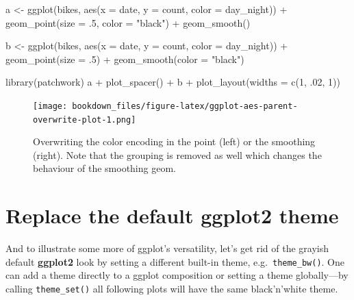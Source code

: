 \documentclass[
]{krantz}
\makeatletter
\newenvironment{Shaded}{\begin{snugshade}}{\end{snugshade}}
\newcommand{\AttributeTok}[1]{\textcolor[rgb]{0.61,0.61,0.61}{#1}}
\newcommand{\DecValTok}[1]{\textcolor[rgb]{0.06,0.06,0.06}{#1}}
\newcommand{\FunctionTok}[1]{\textcolor[rgb]{0,0,0}{#1}}
\newcommand{\NormalTok}[1]{#1}
\newcommand{\OtherTok}[1]{\textcolor[rgb]{0.37,0.37,0.37}{#1}}
\newcommand{\SpecialCharTok}[1]{\textcolor[rgb]{0,0,0}{#1}}
\newcommand{\StringTok}[1]{\textcolor[rgb]{0.5,0.5,0.5}{#1}}
\newenvironment{kframe}{%
\medskip{}
\setlength{\fboxsep}{.8em}
 \def\at@end@of@kframe{}%
 \ifinner\ifhmode%
  \def\at@end@of@kframe{\end{minipage}}%
  \begin{minipage}{\columnwidth}%
 \fi\fi%
 \def\FrameCommand##1{\hskip\@totalleftmargin \hskip-\fboxsep
 \colorbox{shadecolor}{##1}\hskip-\fboxsep
     \hskip-\linewidth \hskip-\@totalleftmargin \hskip\columnwidth}%
 \MakeFramed {\advance\hsize-\width
   \@totalleftmargin\z@ \linewidth\hsize
   \@setminipage}}%
 {\par\unskip\endMakeFramed%
 \at@end@of@kframe}
\renewenvironment{Shaded}{\begin{kframe}}{\end{kframe}}
\makeatother
\begin{document}
\begin{Shaded}
\begin{Highlighting}[]
\NormalTok{a }\OtherTok{\textless{}{-}} \FunctionTok{ggplot}\NormalTok{(bikes, }\FunctionTok{aes}\NormalTok{(}\AttributeTok{x =}\NormalTok{ date, }\AttributeTok{y =}\NormalTok{ count, }\AttributeTok{color =}\NormalTok{ day\_night)) }\SpecialCharTok{+} 
  \FunctionTok{geom\_point}\NormalTok{(}\AttributeTok{size =}\NormalTok{ .}\DecValTok{5}\NormalTok{, }\AttributeTok{color =} \StringTok{"black"}\NormalTok{) }\SpecialCharTok{+}
  \FunctionTok{geom\_smooth}\NormalTok{()}

\NormalTok{b }\OtherTok{\textless{}{-}} \FunctionTok{ggplot}\NormalTok{(bikes, }\FunctionTok{aes}\NormalTok{(}\AttributeTok{x =}\NormalTok{ date, }\AttributeTok{y =}\NormalTok{ count, }\AttributeTok{color =}\NormalTok{ day\_night)) }\SpecialCharTok{+} 
  \FunctionTok{geom\_point}\NormalTok{(}\AttributeTok{size =}\NormalTok{ .}\DecValTok{5}\NormalTok{) }\SpecialCharTok{+}
  \FunctionTok{geom\_smooth}\NormalTok{(}\AttributeTok{color =} \StringTok{"black"}\NormalTok{)}

\FunctionTok{library}\NormalTok{(patchwork)}
\NormalTok{a }\SpecialCharTok{+} \FunctionTok{plot\_spacer}\NormalTok{() }\SpecialCharTok{+}\NormalTok{ b }\SpecialCharTok{+} \FunctionTok{plot\_layout}\NormalTok{(}\AttributeTok{widths =} \FunctionTok{c}\NormalTok{(}\DecValTok{1}\NormalTok{, .}\DecValTok{02}\NormalTok{, }\DecValTok{1}\NormalTok{))}
\end{Highlighting}
\end{Shaded}

\begin{figure}
\centering
\texttt{[image: bookdown\_files/figure-latex/ggplot-aes-parent-overwrite-plot-1.png]}
\caption{\label{fig:ggplot-aes-parent-overwrite-plot}Overwriting the color encoding in the point (left) or the smoothing (right). Note that the grouping is removed as well which changes the behaviour of the smoothing geom.}
\end{figure}

\hypertarget{theme}{%
\section{\texorpdfstring{Replace the default \textbf{ggplot2} theme}{Replace the default ggplot2 theme}}\label{theme}}

And to illustrate some more of ggplot's versatility, let's get rid of the grayish default \textbf{ggplot2} look by setting a different built-in theme, e.g.~\texttt{theme\_bw()}. One can add a theme directly to a ggplot composition or setting a theme globally---by calling \texttt{theme\_set()} all following plots will have the same black'n'white theme.
\end{document}
